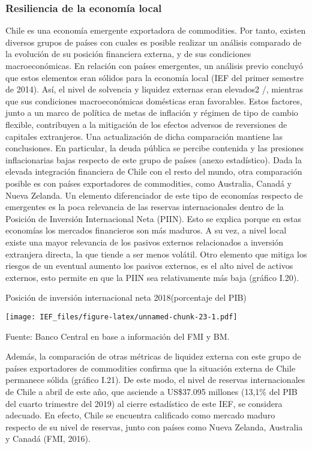 \documentclass[
]{book}
\begin{document}
\hypertarget{RI.14}{%
\subsubsection*{\texorpdfstring{\textbf{Resiliencia de la economía local}}{Resiliencia de la economía local}}\label{RI.14}}

Chile es una economía emergente exportadora de commodities.
Por tanto, existen diversos grupos de países con cuales es posible
realizar un análisis comparado de la evolución de su posición
financiera externa, y de sus condiciones macroeconómicas.
En relación con países emergentes, un análisis previo concluyó
que estos elementos eran sólidos para la economía local (IEF
del primer semestre de 2014). Así, el nivel de solvencia y
liquidez externas eran elevados2
/, mientras que sus condiciones
macroeconómicas domésticas eran favorables. Estos factores,
junto a un marco de política de metas de inflación y régimen
de tipo de cambio flexible, contribuyen a la mitigación de los
efectos adversos de reversiones de capitales extranjeros. Una
actualización de dicha comparación mantiene las conclusiones.
En particular, la deuda pública se percibe contenida y las
presiones inflacionarias bajas respecto de este grupo de países
(anexo estadístico).
Dada la elevada integración financiera de Chile con el resto del
mundo, otra comparación posible es con países exportadores
de commodities, como Australia, Canadá y Nueva Zelanda. Un
elemento diferenciador de este tipo de economías respecto de
emergentes es la poca relevancia de las reservas internacionales
dentro de la Posición de Inversión Internacional Neta (PIIN).
Esto se explica porque en estas economías los mercados
financieros son más maduros. A su vez, a nivel local existe
una mayor relevancia de los pasivos externos relacionados a
inversión extranjera directa, la que tiende a ser menos volátil.
Otro elemento que mitiga los riesgos de un eventual aumento
los pasivos externos, es el alto nivel de activos externos, esto
permite en que la PIIN sea relativamente más baja (gráfico I.20).

Posición de inversión internacional neta 2018(porcentaje del PIB)

\texttt{[image: IEF\_files/figure-latex/unnamed-chunk-23-1.pdf]}

Fuente: Banco Central en base a información del FMI y BM.

Además, la comparación de otras métricas de liquidez externa
con este grupo de países exportadores de commodities confirma
que la situación externa de Chile permanece sólida (gráfico I.21).
De este modo, el nivel de reservas internacionales de Chile a abril
de este año, que asciende a US\$37.095 millones (13,1\% del PIB
del cuarto trimestre del 2019) al cierre estadístico de este IEF,
se considera adecuado. En efecto, Chile se encuentra calificado
como mercado maduro respecto de su nivel de reservas, junto
con países como Nueva Zelanda, Australia y Canadá (FMI, 2016).
\end{document}
